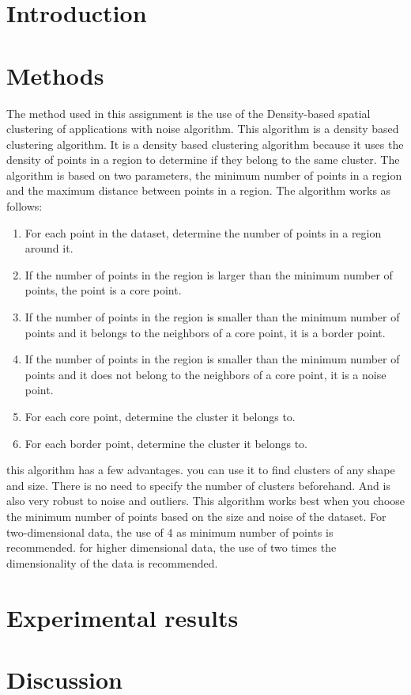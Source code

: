 \documentclass[twoside, a4paper, fleqn, reqno]{article}
\begin{document}
\maketitle

\section*{Introduction}

\section*{Methods}

The method used in this assignment is the use of the Density-based spatial clustering of applications with noise algorithm. 
This algorithm is a density based clustering algorithm. 
It is a density based clustering algorithm because it uses the density of points in a region to determine if they belong to the same cluster. 
The algorithm is based on two parameters, the minimum number of points in a region and the maximum distance between points in a region. 
The algorithm works as follows:
\begin{enumerate}
	\item For each point in the dataset, determine the number of points in a region around it.
	\item If the number of points in the region is larger than the minimum number of points, the point is a core point.
	\item If the number of points in the region is smaller than the minimum number of points and it belongs to the neighbors of a core point, it is a border point.
	\item If the number of points in the region is smaller than the minimum number of points and it does not belong to the neighbors of a core point, it is a noise point.
	\item For each core point, determine the cluster it belongs to.
	\item For each border point, determine the cluster it belongs to.
\end{enumerate}
this algorithm has a few advantages. you can use it to find clusters of any shape and size.
There is no need to specify the number of clusters beforehand. And is also very robust to noise and outliers.
This algorithm works best when you choose the minimum number of points based on the size and noise of the dataset.
For two-dimensional data, the use of 4 as minimum number of points is recommended.
for higher dimensional data, the use of two times the dimensionality of the data is recommended.

\section*{Experimental results}

\section*{Discussion}
\end{document}
